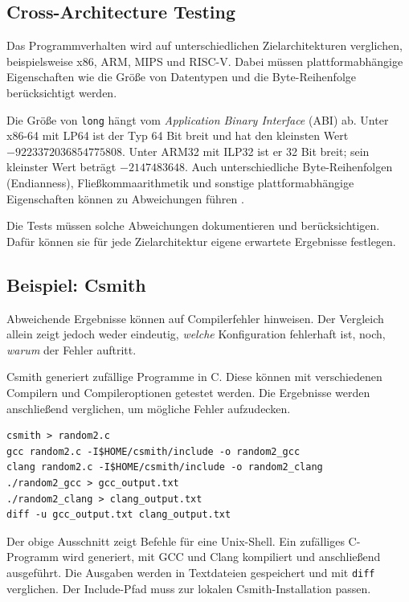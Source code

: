 \documentclass[11pt,a4paper]{article}
\begin{document}
\subsection{Cross-Architecture Testing}

Das Programmverhalten wird auf unterschiedlichen Zielarchitekturen verglichen,
beispielsweise x86, ARM, MIPS und RISC-V. Dabei müssen plattformabhängige
Eigenschaften wie die Größe von Datentypen und die Byte-Reihenfolge
berücksichtigt werden.

Die Größe von \texttt{long} hängt vom \emph{Application Binary Interface} (ABI) ab. Unter x86-64 mit LP64 ist der Typ 64 Bit breit und hat den kleinsten Wert $-9223372036854775808$. Unter ARM32 mit ILP32 ist er 32 Bit breit; sein kleinster Wert beträgt $-2147483648$. Auch unterschiedliche Byte-Reihenfolgen (Endianness), Fließkommaarithmetik und sonstige plattformabhängige Eigenschaften können zu Abweichungen führen \parencite{amd64_psabi_2018}. \parencite{arm_aapcs32} \parencite{wg14_n1570_2011}

Die Tests müssen solche Abweichungen dokumentieren und berücksichtigen. Dafür können sie für jede Zielarchitektur eigene erwartete Ergebnisse festlegen.


\subsection{Beispiel: Csmith}

Abweichende Ergebnisse können auf Compilerfehler hinweisen.
Der Vergleich allein zeigt jedoch weder eindeutig, \emph{welche}
Konfiguration fehlerhaft ist, noch, \emph{warum} der Fehler auftritt.

Csmith \parencite{csmith} generiert zufällige Programme in C. Diese können mit
verschiedenen Compilern und Compileroptionen getestet werden. Die
Ergebnisse werden anschließend verglichen, um mögliche Fehler aufzudecken.

\begin{lstlisting}[caption={GCC-/Clang-Vergleich mit Csmith in einer Unix-Shell}]
csmith > random2.c
gcc random2.c -I$HOME/csmith/include -o random2_gcc
clang random2.c -I$HOME/csmith/include -o random2_clang
./random2_gcc > gcc_output.txt
./random2_clang > clang_output.txt
diff -u gcc_output.txt clang_output.txt
\end{lstlisting}

Der obige Ausschnitt zeigt Befehle für eine Unix-Shell. Ein zufälliges
C-Programm wird generiert, mit GCC und Clang kompiliert und anschließend
ausgeführt. Die Ausgaben werden in Textdateien gespeichert und mit
\texttt{diff} verglichen. Der Include-Pfad muss zur lokalen
Csmith-Installation passen.
\end{document}
